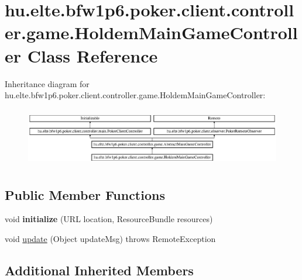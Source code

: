 \hypertarget{classhu_1_1elte_1_1bfw1p6_1_1poker_1_1client_1_1controller_1_1game_1_1_holdem_main_game_controller}{}\section{hu.\+elte.\+bfw1p6.\+poker.\+client.\+controller.\+game.\+Holdem\+Main\+Game\+Controller Class Reference}
\label{classhu_1_1elte_1_1bfw1p6_1_1poker_1_1client_1_1controller_1_1game_1_1_holdem_main_game_controller}
Inheritance diagram for hu.\+elte.\+bfw1p6.\+poker.\+client.\+controller.\+game.\+Holdem\+Main\+Game\+Controller\+:\begin{figure}[H]
\begin{center}
\leavevmode
\includegraphics[height=2.592592cm]{classhu_1_1elte_1_1bfw1p6_1_1poker_1_1client_1_1controller_1_1game_1_1_holdem_main_game_controller}
\end{center}
\end{figure}
\subsection*{Public Member Functions}
\begin{DoxyCompactItemize}
\item 
\hypertarget{classhu_1_1elte_1_1bfw1p6_1_1poker_1_1client_1_1controller_1_1game_1_1_holdem_main_game_controller_ad6beda51b1f26e496cdb73c6938ffdd5}{}void {\bfseries initialize} (U\+R\+L location, Resource\+Bundle resources)\label{classhu_1_1elte_1_1bfw1p6_1_1poker_1_1client_1_1controller_1_1game_1_1_holdem_main_game_controller_ad6beda51b1f26e496cdb73c6938ffdd5}

\item 
void \hyperlink{classhu_1_1elte_1_1bfw1p6_1_1poker_1_1client_1_1controller_1_1game_1_1_holdem_main_game_controller_a01ce61f8e298f1fc1fd11c0b45c7e437}{update} (Object update\+Msg)  throws Remote\+Exception 
\end{DoxyCompactItemize}
\subsection*{Additional Inherited Members}


